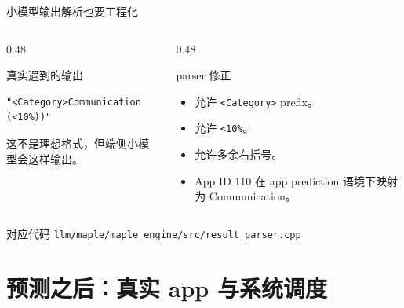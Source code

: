 \documentclass[UTF8,aspectratio=169,10pt]{ctexbeamer}
\newcommand{\code}[1]{\texttt{\small #1}}
\begin{document}
\begin{frame}[fragile]{小模型输出解析也要工程化}
  \begin{columns}[T,totalwidth=\textwidth]
    \begin{column}{0.48\textwidth}
      \begin{block}{真实遇到的输出}
\begin{lstlisting}
"<Category>Communication (<10%))"
\end{lstlisting}
        这不是理想格式，但端侧小模型会这样输出。
      \end{block}
    \end{column}
    \begin{column}{0.48\textwidth}
      \begin{block}{parser 修正}
        \begin{itemize}
          \item 允许 \code{<Category>} prefix。
          \item 允许 \code{<10\%}。
          \item 允许多余右括号。
          \item App ID 110 在 app prediction 语境下映射为 Communication。
        \end{itemize}
      \end{block}
    \end{column}
  \end{columns}
  \vspace{0.5em}
  \begin{block}{对应代码}
    \code{llm/maple/maple\_engine/src/result\_parser.cpp}
  \end{block}
\end{frame}

\section{预测之后：真实 app 与系统调度}
\end{document}
